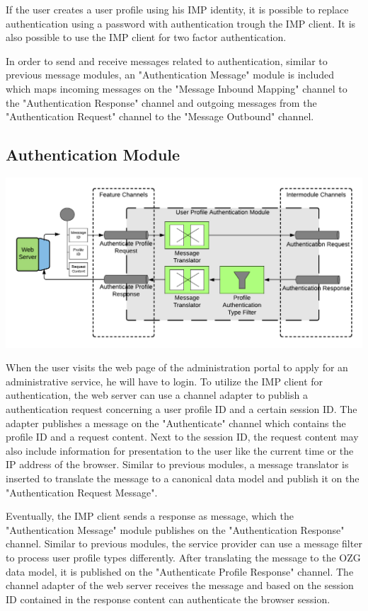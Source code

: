 If the user creates a user profile using his IMP identity, it is possible to replace authentication using a password with authentication trough the IMP client. It is also possible to use the IMP client for two factor authentication.

In order to send and receive messages related to authentication, similar to previous message modules, an "Authentication Message" module is included which maps incoming messages on the "Message Inbound Mapping" channel to the "Authentication Response" channel and outgoing messages from the "Authentication Request" channel to the "Message Outbound" channel.

\subsection{Authentication Module}

\begin{center}
    \includegraphics[scale=0.6]{Diagrams/Integration Architecture 1/Technological Integration/17. Authentication.pdf}
\end{center}

When the user visits the web page of the administration portal to apply for an administrative service, he will have to login. To utilize the IMP client for authentication, the web server can use a channel adapter to publish a authentication request concerning a user profile ID and a certain session ID. The adapter publishes a message on the "Authenticate" channel which contains the profile ID and a request content. Next to the session ID, the request content may also include information for presentation to the user like the current time or the IP address of the browser. Similar to previous modules, a message translator is inserted to translate the message to a canonical data model and publish it on the "Authentication Request Message".

Eventually, the IMP client sends a response as message, which the "Authentication Message" module publishes on the "Authentication Response" channel. Similar to previous modules, the service provider can use a message filter to process user profile types differently. After translating the message to the OZG data model, it is published on the "Authenticate Profile Response" channel. The channel adapter of the web server receives the message and based on the session ID contained in the response content can authenticate the browser session.